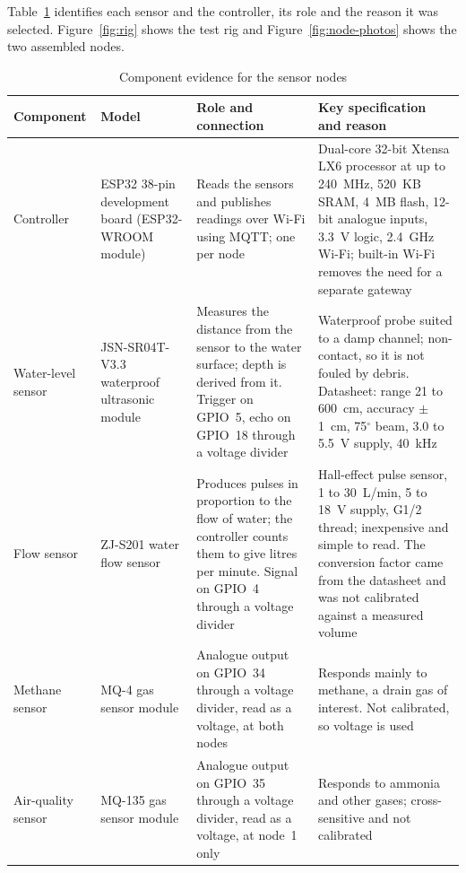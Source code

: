 \documentclass[12pt, a4paper]{article}
\begin{document}
Table~\ref{tab:env-iot} identifies each sensor and the controller, its role and the reason it was selected. Figure~\ref{fig:rig} shows the test rig and Figure~\ref{fig:node-photos} shows the two assembled nodes.

\begin{table}[H]
\centering

\begin{tabular}{|p{2.6cm}|p{2.9cm}|p{4.6cm}|p{4.0cm}|}
\hline
\textbf{Component} & \textbf{Model} & \textbf{Role and connection} & \textbf{Key specification and reason} \\
\hline
Controller & ESP32 38-pin development board (ESP32-WROOM module) & Reads the sensors and publishes readings over Wi-Fi using MQTT; one per node & Dual-core 32-bit Xtensa LX6 processor at up to 240~MHz, 520~KB SRAM, 4~MB flash, 12-bit analogue inputs, 3.3~V logic, 2.4~GHz Wi-Fi; built-in Wi-Fi removes the need for a separate gateway \\
\hline
Water-level sensor & JSN-SR04T-V3.3 waterproof ultrasonic module & Measures the distance from the sensor to the water surface; depth is derived from it. Trigger on GPIO~5, echo on GPIO~18 through a voltage divider & Waterproof probe suited to a damp channel; non-contact, so it is not fouled by debris. Datasheet: range 21 to 600~cm, accuracy $\pm$1~cm, 75$^{\circ}$ beam, 3.0 to 5.5~V supply, 40~kHz \\
\hline
Flow sensor & ZJ-S201 water flow sensor & Produces pulses in proportion to the flow of water; the controller counts them to give litres per minute. Signal on GPIO~4 through a voltage divider & Hall-effect pulse sensor, 1 to 30~L/min, 5 to 18~V supply, G1/2 thread; inexpensive and simple to read. The conversion factor came from the datasheet and was not calibrated against a measured volume \\
\hline
Methane sensor & MQ-4 gas sensor module & Analogue output on GPIO~34 through a voltage divider, read as a voltage, at both nodes & Responds mainly to methane, a drain gas of interest. Not calibrated, so voltage is used \\
\hline
Air-quality sensor & MQ-135 gas sensor module & Analogue output on GPIO~35 through a voltage divider, read as a voltage, at node~1 only & Responds to ammonia and other gases; cross-sensitive and not calibrated \\
\hline
\end{tabular}
\caption{Component evidence for the sensor nodes}
\label{tab:env-iot}
\end{table}
\end{document}
